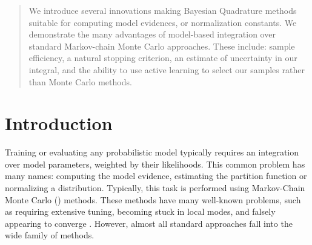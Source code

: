 \documentclass{article}
\begin{document}
 

\begin{abstract} 
We introduce several innovations making Bayesian Quadrature methods suitable for computing model evidences, or normalization constants.  We demonstrate the many advantages of model-based integration over standard Markov-chain Monte Carlo approaches.  These include: sample efficiency, a natural stopping criterion, an estimate of uncertainty in our integral, and the ability to use active learning to select our samples rather than Monte Carlo methods.
\end{abstract} 

\section{Introduction}

Training or evaluating any probabilistic model typically requires an integration over model parameters, weighted by their likelihoods.  This common problem has many names:  computing the model evidence, estimating the partition function or normalizing a distribution.  Typically, this task is performed using Markov-Chain Monte Carlo () methods.  These methods have many well-known problems, such as requiring extensive tuning, becoming stuck in local modes, and falsely appearing to converge \citep{NealMC}.  However, almost all standard approaches fall into the wide family of  methods.
\end{document}

